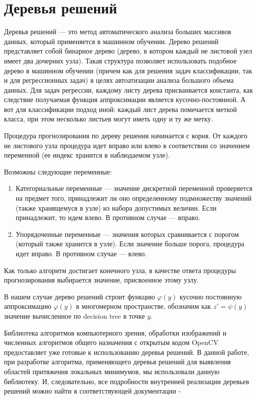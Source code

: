 \documentclass[12pt, a4paper, russian]{article}
\begin{document}
\section{Деревья решений}

Деревья решений --- это метод автоматического анализа больших массивов данных, который применяется в машинном обучении. Дерево решений представляет собой бинарное дерево (дерево, в котором каждый не листовой узел имеет два дочерних узла). Такая структура позволяет использовать подобное дерево в машинном обучении (причем как для решения задач классификации, так и для регрессионных задач) в целях автоатизации анализа большого объема данных. Для задач регрессии, каждому листу дерева присваивается константа, как следствие  получаемая функция аппроксимации является кусочно-постоянной. А вот для классификации подход иной: каждый лист дерева помечается меткой класса, при этом несколько листьев могут иметь одну и ту же метку. 

Процедура прогнозирования по дереву решения начинается с корня. От каждого не листового узла процедура идет вправо или влево в соответствии со значением переменной (ее индекс хранится в наблюдаемом узле). 

Возможны следующие переменные:
\begin{enumerate}

	\item Категориальные переменные --- значение дискретной переменной проверяется на предмет того, принадлежит ли оно определенному подмножеству значений (также хранящемуся в узле) из набора допустимых величин. Если принадлежит, то идем влево. В противном случае --- вправо. 

	\item Упорядоченные переменные --- значения которых сравнивается с порогом (который также хранится в узле). Если значение больше порога, процедура идет вправо. В противном случае --- влево.
\end{enumerate}

Как только алгоритм достигает конечного узла, в качестве ответа процедуры прогнозирования выбирается значение, присвоенное этому узлу. 

В нашем случае дерево решений строит функцию $\varphi(y)$ кусочно постоянную аппроксимацию $\varphi(y)$  в многомерном пространстве, обозначим как $z' = \psi(y)$ значение вычисленное по decision tree в точке $y$.

Библиотека алгоритмов компьютерного зрения, обработки изображений и численных алгоритмов общего назначения с открытым кодом OpenCV предоставляет уже готовые к использованию деревья решений. В данной работе, при разработке алгоритма, применяющего деревья решений для выявления областей притяжения локальных минимумов, мы использовали данную библиотеку. И, следовательно, все подробности внутренней реализации деревьев решений можно найти в соответствующей документации - \cite{fio_bib16}
\end{document}
